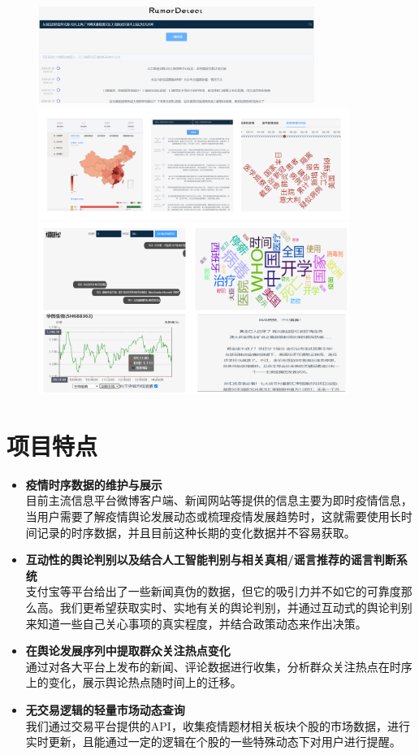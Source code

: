 \documentclass{article}
\begin{document}
\begin{figure}[H]
\centering
\includegraphics[width=0.8\textwidth]{pic0.png}
\includegraphics[width=0.9\textwidth]{pic1.png}
\includegraphics[width=0.9\textwidth]{pic2.png}
\end{figure}

\section{项目特点}
\begin{itemize}
	\item{\textbf{疫情时序数据的维护与展示}\\
	目前主流信息平台微博客户端、新闻网站等提供的信息主要为即时疫情信息，当用户需要了解疫情舆论发展动态或梳理疫情发展趋势时，这就需要使用长时间记录的时序数据，并且目前这种长期的变化数据并不容易获取。}
	\item{\textbf{互动性的舆论判别以及结合人工智能判别与相关真相/谣言推荐的谣言判断系统}\\
	支付宝等平台给出了一些新闻真伪的数据，但它的吸引力并不如它的可靠度那么高。我们更希望获取实时、实地有关的舆论判别，并通过互动式的舆论判别来知道一些自己关心事项的真实程度，并结合政策动态来作出决策。}
	\item{\textbf{在舆论发展序列中提取群众关注热点变化}}\\
	通过对各大平台上发布的新闻、评论数据进行收集，分析群众关注热点在时序上的变化，展示舆论热点随时间上的迁移。
	\item{\textbf{无交易逻辑的轻量市场动态查询}}\\
	我们通过交易平台提供的API，收集疫情题材相关板块个股的市场数据，进行实时更新，且能通过一定的逻辑在个股的一些特殊动态下对用户进行提醒。

\end{itemize}
\end{document}
